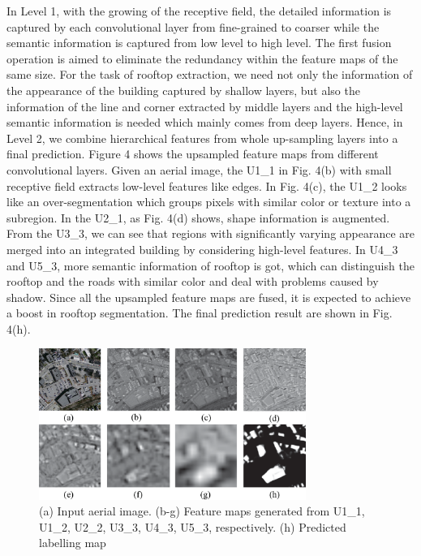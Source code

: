 \setlength{\parindent}{2ex}In Level 1, with the growing of the receptive field, the detailed information is captured by each convolutional layer from fine-grained to coarser while the semantic information is captured from low level to high level. The first fusion operation is aimed to eliminate the redundancy within the feature maps of the same size. For the task of rooftop extraction, we need not only the information of the appearance of the building captured by shallow layers, but also the information of the line and corner extracted by middle layers and the high-level semantic information is needed which mainly comes from deep layers. Hence, in Level 2, we combine hierarchical features from whole up-sampling layers into a final prediction. Figure 4 shows the upsampled feature maps from different convolutional layers. Given an aerial image, the U1\_1 in Fig. 4(b) with small receptive field extracts low-level features like edges. In Fig. 4(c), the U1\_2 looks like an over-segmentation which groups pixels with similar color or texture into a subregion. In the U2\_1, as Fig. 4(d) shows, shape information is augmented. From the U3\_3, we can see that regions with significantly varying appearance are merged into an integrated building by considering high-level features. In U4\_3 and U5\_3, more semantic information of rooftop is got, which can distinguish the rooftop and the roads with similar color and deal with problems caused by shadow. Since all the upsampled feature maps are fused, it is expected to achieve a boost in rooftop segmentation. The final prediction result are shown in Fig. 4(h).
\begin{figure}
\centering
\includegraphics[width=8.7cm]{Figures/feature_maps.eps}
\caption{(a) Input aerial image. (b-g) Feature maps generated from U1\_1, U1\_2, U2\_2, U3\_3, U4\_3, U5\_3, respectively. (h) Predicted labelling map}
\label{4}
\end{figure}
